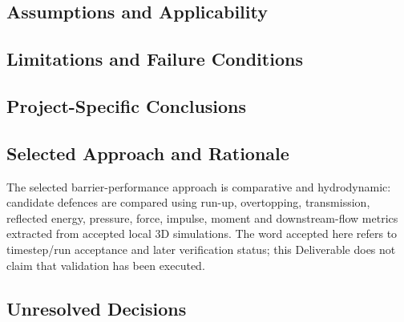 
\subsection{Assumptions and Applicability}
\label{sec:res-phy-bar-assumptions}


\subsection{Limitations and Failure Conditions}
\label{sec:res-phy-bar-limitations}


\subsection{Project-Specific Conclusions}
\label{sec:res-phy-bar-conclusions}


\subsection{Selected Approach and Rationale}
\label{sec:res-phy-bar-selected-approach}


The selected barrier-performance approach is comparative and
hydrodynamic: candidate defences are compared using run-up,
overtopping, transmission, reflected energy, pressure, force, impulse,
moment and downstream-flow metrics extracted from accepted local 3D
simulations. The word accepted here refers to timestep/run acceptance
and later verification status; this Deliverable does not claim that
validation has been executed.

\subsection{Unresolved Decisions}
\label{sec:res-phy-bar-unresolved-decisions}

